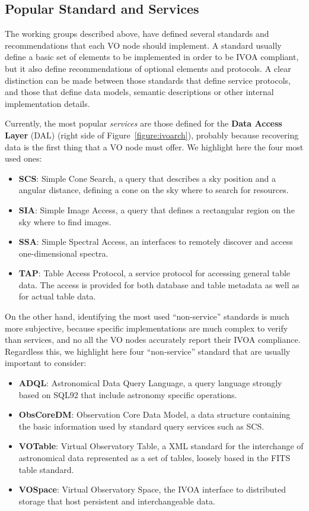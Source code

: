 \subsection{Popular Standard and Services}
\label{sec:popservices}

The working groups described above, have defined several standards
and recommendations that each VO node should implement. A standard usually 
define a basic set of elements to be implemented in order
to be IVOA compliant, but it also define recommendations of optional
elements and protocols. A clear distinction can be made between those
standards that define service protocols, and those that define data models,
semantic descriptions or other internal implementation details.

Currently, the most popular \emph{services} are those defined for
the \textbf{Data Access Layer} (DAL) (right side of Figure~\ref{figure:ivoarch}), 
probably because recovering data is the first thing that a VO node must offer.
We highlight here the four most used ones:
\begin{itemize}
\item \textbf{SCS}: Simple Cone Search, a query that describes a sky position and a
angular distance, defining a cone on the sky where to search for resources.
\item \textbf{SIA}: Simple Image Access, a query that defines a rectangular region on
the sky where to find images.
\item \textbf{SSA}: Simple Spectral Access, an interfaces to remotely discover
and access one-dimensional spectra. 
\item \textbf{TAP}: Table Access Protocol, a service protocol for accessing
general table data. The access is provided for both database and table metadata
as well as for actual table data.
\end{itemize}

On the other hand, identifying the most used ``non-service'' standards is much
more subjective, because specific implementations are much complex to verify
than services, and no all the VO nodes accurately report their IVOA compliance. 
Regardless this, we highlight here four ``non-service'' standard that are usually important
to consider:
\begin{itemize}
\item \textbf{ADQL}: Astronomical Data Query Language, a query language strongly
based on SQL92 that include astronomy specific operations. 
\item \textbf{ObsCoreDM}: Observation Core Data Model, a data structure
containing the basic information used by standard query services such as SCS.
\item \textbf{VOTable}: Virtual Observatory Table, a XML standard for the
interchange of astronomical data represented as a set of tables, loosely based 
in the FITS table standard.
\item \textbf{VOSpace}: Virtual Observatory Space, the IVOA interface to
distributed storage that host persistent and interchangeable data.
\end{itemize}

